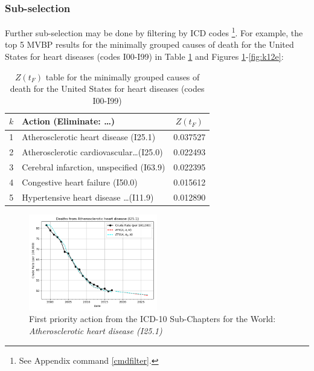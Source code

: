 \documentclass[10pt, a4paper, twocolumn]{IEEEconf}
\newcommand\footnotesstartsep{}
\begin{document}
\clearpage

\subsubsection{Sub-selection}

Further sub-selection may be done by filtering by ICD codes \citep{icd10vol1}\footnotesstartsep\footnote{See Appendix command \ref{cmdfilter}.}. For example, the top 5 MVBP results for the minimally grouped causes of death for the United States for heart diseases (codes I00-I99) in Table \ref{table:ztable12} and Figures \ref{fig:k12a}-\ref{fig:k12e}:

\begin{table}[H]
  \centering
  \begin{tabular}{clc}
    \toprule
      $k$ & Action (Eliminate: \ldots) & $Z(t_F)$ \\
    \midrule
      1 &        Atherosclerotic heart disease (I25.1) & 0.037527 \\
      2 & Atherosclerotic cardiovascular\ldots (I25.0) & 0.022493 \\
      3 &     Cerebral infarction, unspecified (I63.9) & 0.022395 \\
      4 &             Congestive heart failure (I50.0) & 0.015612 \\
      5 &    Hypertensive heart disease \ldots (I11.9) & 0.012890 \\
    \bottomrule
  \end{tabular}
  \caption{$Z(t_F)$ table for the minimally grouped causes of death for the United States for heart diseases (codes I00-I99)}
  \label{table:ztable12}
\end{table}

\begin{figure}[H]
  \centering
  \includegraphics[width=0.5\textwidth]{results/US_ICD10_MINIMALLY_GROUPED/Atherosclerotic_heart_disease_I25_1_ets.png}
  \caption{First priority action from the ICD-10 Sub-Chapters for the World: \textit{Atherosclerotic heart disease (I25.1)}}\label{fig:k12a}
\end{figure}
\end{document}

